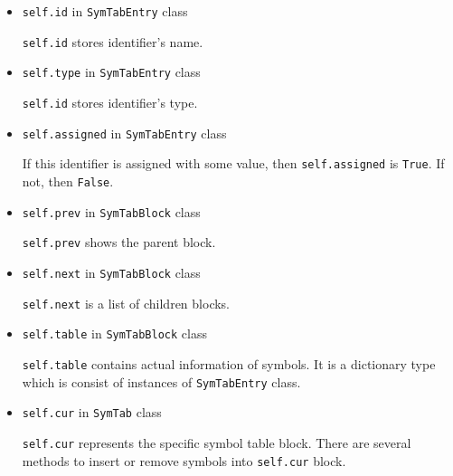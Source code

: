 \documentclass{article}
\newcommand{\code}[1]{\texttt{#1}}
\begin{document}
	\begin{itemize}
		\item \code{self.id} in \code{SymTabEntry} class
		
		\code{self.id} stores identifier's name.
		
		\item \code{self.type} in \code{SymTabEntry} class
		
		\code{self.id} stores identifier's type.
		
		\item \code{self.assigned} in \code{SymTabEntry} class
		
		If this identifier is assigned with some value, then \code{self.assigned} is \code{True}. If not, then \code{False}.

		\item \code{self.prev} in \code{SymTabBlock} class
		
		\code{self.prev} shows the parent block.

		\item \code{self.next} in \code{SymTabBlock} class
		
		\code{self.next} is a list of children blocks.

		\item \code{self.table} in \code{SymTabBlock} class
		
		\code{self.table} contains actual information of symbols. It is a dictionary type which is consist of instances of \code{SymTabEntry} class.

		\item \code{self.cur} in \code{SymTab} class
		
		\code{self.cur} represents the specific symbol table block. There are several methods to insert or remove symbols into \code{self.cur} block.
	\end{itemize}
\end{document}
